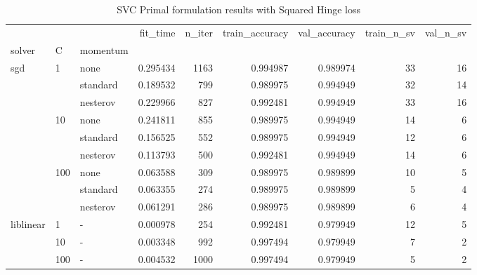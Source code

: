 \begin{table}[H]
\centering
\caption{SVC Primal formulation results with Squared Hinge loss}
\label{primal_svc_squared_hinge_cv_results}
\begin{tabular}{lllrrrrrr}
\toprule
          &     &   &  fit\_time &  n\_iter &  train\_accuracy &  val\_accuracy &  train\_n\_sv &  val\_n\_sv \\
solver & C & momentum &           &         &                 &               &             &           \\
\midrule
sgd & 1   & none &  0.295434 &    1163 &        0.994987 &      0.989974 &          33 &        16 \\
          &     & standard &  0.189532 &     799 &        0.989975 &      0.994949 &          32 &        14 \\
          &     & nesterov &  0.229966 &     827 &        0.992481 &      0.994949 &          33 &        16 \\
          & 10  & none &  0.241811 &     855 &        0.989975 &      0.994949 &          14 &         6 \\
          &     & standard &  0.156525 &     552 &        0.989975 &      0.994949 &          12 &         6 \\
          &     & nesterov &  0.113793 &     500 &        0.992481 &      0.994949 &          14 &         6 \\
          & 100 & none &  0.063588 &     309 &        0.989975 &      0.989899 &          10 &         5 \\
          &     & standard &  0.063355 &     274 &        0.989975 &      0.989899 &           5 &         4 \\
          &     & nesterov &  0.061291 &     286 &        0.989975 &      0.989899 &           6 &         4 \\
liblinear & 1   & - &  0.000978 &     254 &        0.992481 &      0.979949 &          12 &         5 \\
          & 10  & - &  0.003348 &     992 &        0.997494 &      0.979949 &           7 &         2 \\
          & 100 & - &  0.004532 &    1000 &        0.997494 &      0.979949 &           5 &         2 \\
\bottomrule
\end{tabular}
\end{table}
